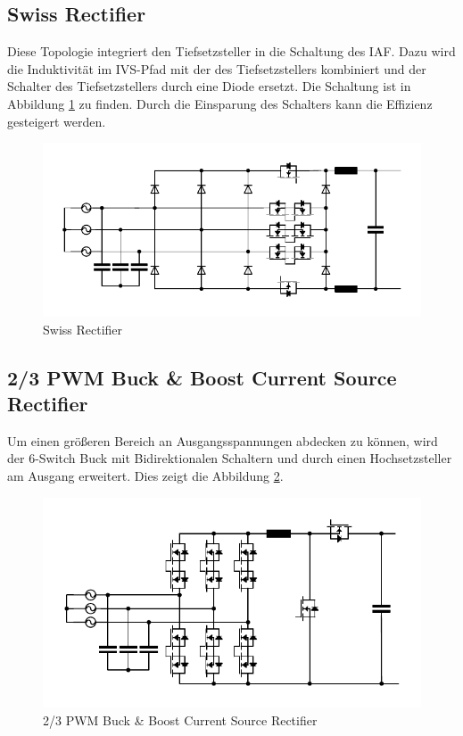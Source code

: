 	\subsection{Swiss Rectifier}
		Diese Topologie integriert den Tiefsetzsteller in die Schaltung des \gls{IAF}. Dazu wird die Induktivität im IVS-Pfad mit der des Tiefsetzstellers kombiniert und der Schalter des Tiefsetzstellers durch eine Diode ersetzt. Die Schaltung ist in Abbildung \ref{fig:swiss} zu finden. Durch die Einsparung des Schalters kann die Effizienz gesteigert werden.
		\begin{figure}[H]
			\centering
			\includegraphics[width=0.9\linewidth]{content/Grafiken/Swiss}
			\caption{Swiss Rectifier}
			\label{fig:swiss}
		\end{figure}
		
	\subsection{2/3 PWM Buck \& Boost Current Source Rectifier} \label{sec:2/3BuckBoost}
		Um einen größeren Bereich an Ausgangsspannungen abdecken zu können, wird der 6-Switch Buck mit Bidirektionalen Schaltern und durch einen Hochsetzsteller am Ausgang erweitert. Dies zeigt die Abbildung \ref{fig:23pwmbuckboost}. 
		\begin{figure}[H]
			\centering
			\includegraphics[width=0.9\linewidth]{content/Grafiken/23PWMBuckBoost}
			\caption{2/3 PWM Buck \& Boost Current Source Rectifier}
			\label{fig:23pwmbuckboost}
		\end{figure}
